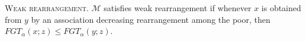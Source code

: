 \documentclass[english, a4paper,12pt]{article}
\begin{document}
	\vspace{2ex}
		\textsc{Weak rearrangement.} $\mathcal{M}$ satisfies weak rearrangement if whenever $x$ is obtained from $y$ by an association decreasing rearrangement among the poor, then $FGT_{\alpha}(x; z) \leq FGT_{\alpha}(y ; z)$.

\newpage
%
%		
	


\end{document}

